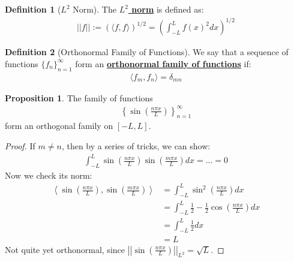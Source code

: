 \documentclass[11pt]{scrartcl}
\theoremstyle{definition}
\newtheorem{definition}{Definition}
\newtheorem{prop}{Proposition}
\theoremstyle{remark}
\newcommand{\dfn}[1]{\textbf{\underline{#1}}}
\newcommand{\idx}[2]{\int_{#1}^{#2}}
\begin{document}
\begin{definition}[$L^2$ Norm]
	The \dfn{$L^2$ norm} is defined as:
	\begin{align}
		||f|| := \left( \langle f, f \rangle \right)^{1/2} 	 = \left( \idx{-L}{L} f(x)^2 dx \right)^{1/2} 
	\end{align}
\end{definition}

\begin{definition}[Orthonormal Family of Functions]
	We say that a sequence of functions $\{ f_n \}_{n=1}^\infty$ form an \dfn{orthonormal family of functions} if: 
	\begin{align*}
		\langle f_m , f_n \rangle = \delta_{mn} 
	\end{align*}
\end{definition}

\begin{prop}
	The family of functions
	\begin{align}
	\left\{ \sin \left( \frac{n \pi x}{L} \right) \right\}_{n=1}^\infty 	
	\end{align}
	form an orthogonal family on $[-L, L]$.
\end{prop}

\begin{proof}
	If $m \neq n$, then by a series of tricks, we can show: 
	\begin{align}
		\idx{-L}{L}  \sin \left( \frac{n \pi x}{L} \right) \sin \left( \frac{m \pi x}{L} \right)dx 	= ... = 0 
	\end{align}
	Now we check its norm: 
	\begin{align*}
		\left\langle \sin \left( \frac{n \pi x}{L} \right) , \sin \left( \frac{m \pi x}{L} \right) \right\rangle & = \idx{-L}{L} \sin^2 \left( \frac{n \pi x}{L} \right) dx \\
		& = \idx{-L}{L} \frac{1}{2} - \frac{1}{2} \cos \left( \frac{n \pi x}{L} \right) dx \\
		& = \idx{-L}{L} \frac{1}{2} dx \\
		& = L 
	\end{align*}
	Not quite yet orthonormal, since $\left| \left| \sin \left( \frac{n \pi x}{L} \right)  \right| \right|_{L^2} = \sqrt{L}$. 
\end{proof}
\end{document}
